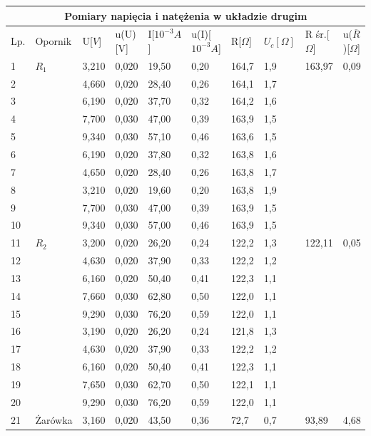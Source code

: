 \documentclass[12pt]{article}
\begin{document}
\begin{adjustbox}{center}
\begin{tabular}{|p{0.5cm}|p{1.5cm}|p{1cm}|p{1.5cm}|p{1.5cm}|p{2cm}|p{1.3cm}|p{1.2cm}|p{1.5cm}|p{1.5cm}|}
    
    \hline
    \multicolumn{10}{|c|}{Pomiary napięcia i natężenia w układzie drugim} \\
    \hline
    Lp. & Opornik& U[$V$]& u(U)[V] & I[$10^{-3}A$] & u(I)[$10^{-3}A$] & R[$\Omega$] & $U_c[\Omega]$ & R śr.[$\Omega$] & u($\overline{R}$)[$\Omega$] \\ 
    \hline
    1 & $R_1$ & 3,210 & 0,020 & 19,50 & 0,20 & 164,7 & 1,9 & 163,97 & 0,09\\
    2 && 4,660 & 0,020 & 28,40 & 0,26 & 164,1& 1,7 && \\
    3 && 6,190 & 0,020& 37,70& 0,32 & 164,2& 1,6 && \\
    4 && 7,700 & 0,030& 47,00& 0,39 & 163,9& 1,5 && \\
    5 && 9,340 & 0,030& 57,10& 0,46 & 163,6& 1,5&& \\
    6 && 6,190 & 0,020& 37,80& 0,32 & 163,8& 1,6&& \\
    7 && 4,650 & 0,020& 28,40& 0,26 & 163,8& 1,7&& \\
    8 && 3,210 & 0,020& 19,60& 0,20 & 163,8& 1,9&& \\
    9 && 7,700 & 0,030& 47,00& 0,39 & 163,9& 1,5&& \\
    10 && 9,340 & 0,030 & 57,00 & 0,46 & 163,9& 1,5&& \\
    \hline
    11 & $R_2$ & 3,200 & 0,020 & 26,20 & 0,24 & 122,2 & 1,3 & 122,11 & 0,05 \\
    12 && 4,630 & 0,020 & 37,90 & 0,33 & 122,2& 1,2 && \\
    13 && 6,160 & 0,020 & 50,40 & 0,41 & 122,3& 1,1 && \\
    14 && 7,660 & 0,030 & 62,80 & 0,50 & 122,0& 1,1 && \\
    15 && 9,290 & 0,030 & 76,20 & 0,59 & 122,0& 1,1 && \\
    16 && 3,190 & 0,020 & 26,20 & 0,24 & 121,8& 1,3 && \\
    17 && 4,630 & 0,020 & 37,90 & 0,33 & 122,2& 1,2 && \\
    18 && 6,160 & 0,020 & 50,40 & 0,41 & 122,3& 1,1 && \\
    19 && 7,650 & 0,030 & 62,70 & 0,50 & 122,1& 1,1 && \\
    20 && 9,290 & 0,030 & 76,20 & 0,59 & 122,0& 1,1 && \\
    \hline
    21 & Żarówka & 3,160 & 0,020 & 43,50 & 0,36 & 72,7 & 0,7 & 93,89 & 4,68 \\

\end{tabular}
\end{adjustbox}
\end{document}
